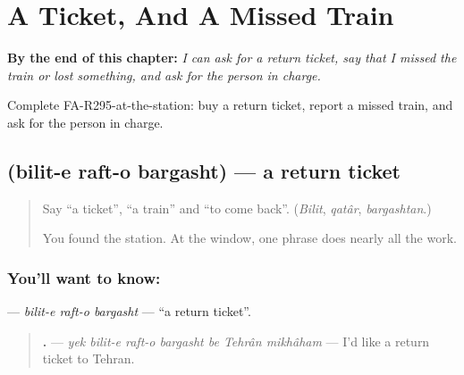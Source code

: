 
\chapter{A Ticket, And A Missed Train}
\label{ch:fa-a-ticket-and-a-missed-train}

\begin{chapteropening}
\textbf{By the end of this chapter:} \emph{I can ask for a return ticket, say that I missed the train or lost something, and ask for the person in charge.}

Complete FA-R295-at-the-station: buy a return ticket, report a missed train, and ask for the person in charge.
\end{chapteropening}

\section[\texorpdfstring{\fa{بلیت} \fa{رفت} \fa{و} \fa{برگشت} (bilit-e raft-o …)}{بلیت رفت و برگشت (bilit-e raft-o …)}]{    (bilit-e raft-o bargasht) — a return ticket}

\label{lesson:FA-C295-raft-o-bargasht}



\begin{quote}
Say \textquotedblleft{}a ticket\textquotedblright{}, \textquotedblleft{}a train\textquotedblright{} and \textquotedblleft{}to come back\textquotedblright{}. (\emph{Bilit}, \emph{qatâr}, \emph{bargashtan}.)

You found the station. At the window, one phrase does nearly all the work.
\end{quote}

\subsection*{You'll want to know:    }
\textbf{   } — \emph{bilit-e raft-o bargasht} — \textquotedblleft{}a return ticket\textquotedblright{}.

\begin{quote}
\textbf{       .} — \emph{yek bilit-e raft-o bargasht be Tehrân mikhâham} — I'd like a return ticket to Tehran.
\end{quote}

